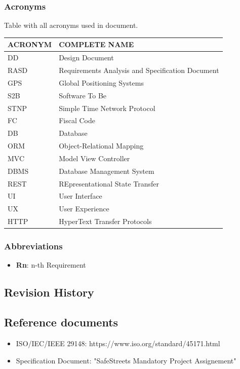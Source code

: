 \documentclass{article}
\begin{document}
\subsubsection{Acronyms}
Table with all acronyms used in document.
\begin{center}
\begin{tabular}{ | l | l |}
    \hline
    ACRONYM & COMPLETE NAME \\
    \hline
    DD & Design Document \\
    \hline
    RASD & Requirements Analysis and Specification Document \\
    \hline
    GPS & Global Positioning Systems \\
    \hline
    S2B & Software To Be \\
    \hline
    STNP & Simple Time Network Protocol \\
    \hline 
    FC & Fiscal Code \\
    \hline
    DB & Database \\
    \hline
    ORM & Object-Relational Mapping \\
    \hline
    MVC & Model View Controller \\
    \hline
    DBMS & Database Management System \\
    \hline
    REST & REpresentational State Transfer \\
    \hline
    UI & User Interface \\
    \hline
    UX & User Experience \\
    \hline
    HTTP & HyperText Transfer Protocols \\
    \hline
\end{tabular}
\end{center}

\subsubsection{Abbreviations}
\begin{itemize}
    \item \textbf{Rn}: n-th Requirement 
\end{itemize}

\subsection{Revision History}

\subsection{Reference documents}
\begin{itemize}
    \item ISO/IEC/IEEE 29148: https://www.iso.org/standard/45171.html
    \item Specification Document: "SafeStreets Mandatory Project Assignement"
\end{itemize}
\end{document}
